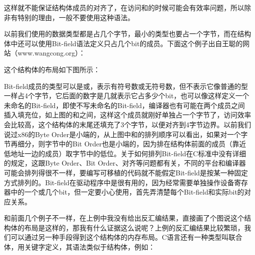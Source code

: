 这样就不能保证结构体成员的对齐了，在访问和的时候可能会有效率问题，所以除非有特别的理由，一般不要使用这种语法。



以前我们使用的数据类型都是占几个字节，最小的类型也要占一个字节，而在结构体中还可以使用Bit-field语法定义只占几个bit的成员。下面这个例子出自王聪的网站（www.\BookSplit{}wangcong.\BookSplit{}org）：





这个结构体的布局如下图所示：




Bit-field成员的类型可以是或，表示有符号数或无符号数，但不表示它像普通的型一样占4个字节，它后面的数字是几就表示它占多少个bit，也可以像这样定义一个未命名的Bit-field，即使不写未命名的Bit-field，编译器也有可能在两个成员之间插入填充位，如上图的和之间，这样这个成员就刚好单独占一个字节了，访问效率会比较高，这个结构体的末尾还填充了3个字节，以便对齐到4字节边界。以前我们说过x86的Byte Order是小端的，从上图中和的排列顺序可以看出，如果对一个字节再细分，则字节中的Bit Order也是小端的，因为排在结构体前面的成员（靠近低地址一边的成员）取字节中的低位。关于如何排列Bit-field在C标准中没有详细的规定，这跟Byte Order、Bit Order、对齐等问题都有关，不同的平台和编译器可能会排列得很不一样，要编写可移植的代码就不能假定Bit-field是按某一种固定方式排列的。Bit-field在驱动程序中是很有用的，因为经常需要单独操作设备寄存器中的一个或几个bit，但一定要小心使用，首先弄清楚每个Bit-field和实际bit的对应关系。



和前面几个例子不一样，在上例中我没有给出反汇编结果，直接画了个图说这个结构体的布局是这样的，那我有什么证据这么说呢？上例的反汇编结果比较繁琐，我们可以通过另一种手段得到这个结构体的内存布局。C语言还有一种类型叫联合体，用关键字定义，其语法类似于结构体，例如：





